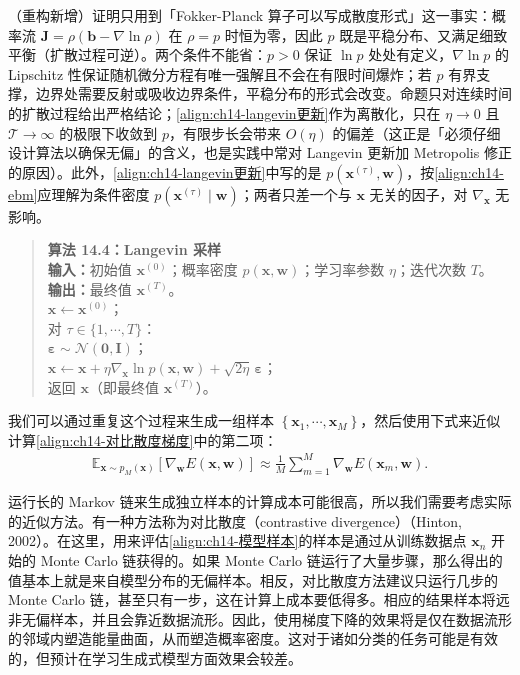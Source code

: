 \documentclass[../../main.tex]{subfiles}
\begin{document}
\begin{remark}（重构新增）证明只用到「Fokker-Planck 算子可以写成散度形式」这一事实：概率流 $\bm{J}=\rho\left(\bm{b}-\nabla\ln\rho\right)$ 在 $\rho=p$ 时恒为零，因此 $p$ 既是平稳分布、又满足细致平衡（扩散过程可逆）。两个条件不能省：$p>0$ 保证 $\ln p$ 处处有定义，$\nabla\ln p$ 的 Lipschitz 性保证随机微分方程有唯一强解且不会在有限时间爆炸；若 $p$ 有界支撑，边界处需要反射或吸收边界条件，平稳分布的形式会改变。命题只对连续时间的扩散过程给出严格结论；\eqref{align:ch14-langevin更新}作为离散化，只在 $\eta\to0$ 且 $\mathcal{T}\to\infty$ 的极限下收敛到 $p$，有限步长会带来 $O(\eta)$ 的偏差（这正是「必须仔细设计算法以确保无偏」的含义，也是实践中常对 Langevin 更新加 Metropolis 修正的原因）。此外，\eqref{align:ch14-langevin更新}中写的是 $p\!\left(\bm{x}^{(\tau)},\bm{w}\right)$，按\eqref{align:ch14-ebm}应理解为条件密度 $p\!\left(\bm{x}^{(\tau)}\mid\bm{w}\right)$；两者只差一个与 $\bm{x}$ 无关的因子，对 $\nabla_{\bm{x}}$ 无影响。
\end{remark}

\begin{quote}
\small
\textbf{算法 14.4：Langevin 采样}\\
\textbf{输入：}初始值 $\bm{x}^{(0)}$；概率密度 $p(\bm{x},\bm{w})$；学习率参数 $\eta$；迭代次数 $T$。\\
\textbf{输出：}最终值 $\bm{x}^{(T)}$。\\
$\bm{x}\leftarrow\bm{x}^{(0)}$；\\
对 $\tau\in\{1,\cdots,T\}$：\\
\quad $\bm{\varepsilon}\sim\mathcal{N}(\bm{0},\bm{I})$；\\
\quad $\bm{x}\leftarrow\bm{x}+\eta\nabla_{\bm{x}}\ln p(\bm{x},\bm{w})+\sqrt{2\eta}\,\bm{\varepsilon}$；\\
返回 $\bm{x}$（即最终值 $\bm{x}^{(T)}$）。
\end{quote}

我们可以通过重复这个过程来生成一组样本 $\left\{\bm{x}_{1},\cdots,\bm{x}_{M}\right\}$，然后使用下式来近似计算\eqref{align:ch14-对比散度梯度}中的第二项：
\begin{align}
\mathbb{E}_{\bm{x}\sim p_{M}(\bm{x})}\left[\nabla_{\bm{w}}E(\bm{x},\bm{w})\right]\approx\frac{1}{M}\sum_{m=1}^{M}\nabla_{\bm{w}}E\!\left(\bm{x}_{m},\bm{w}\right).
\label{align:ch14-模型样本}
\end{align}

运行长的 Markov 链来生成独立样本的计算成本可能很高，所以我们需要考虑实际的近似方法。有一种方法称为对比散度（contrastive divergence）（Hinton, 2002）。在这里，用来评估\eqref{align:ch14-模型样本}的样本是通过从训练数据点 $\bm{x}_{n}$ 开始的 Monte Carlo 链获得的。如果 Monte Carlo 链运行了大量步骤，那么得出的值基本上就是来自模型分布的无偏样本。相反，对比散度方法建议只运行几步的 Monte Carlo 链，甚至只有一步，这在计算上成本要低得多。相应的结果样本将远非无偏样本，并且会靠近数据流形。因此，使用梯度下降的效果将是仅在数据流形的邻域内塑造能量曲面，从而塑造概率密度。这对于诸如分类的任务可能是有效的，但预计在学习生成式模型方面效果会较差。
\end{document}

